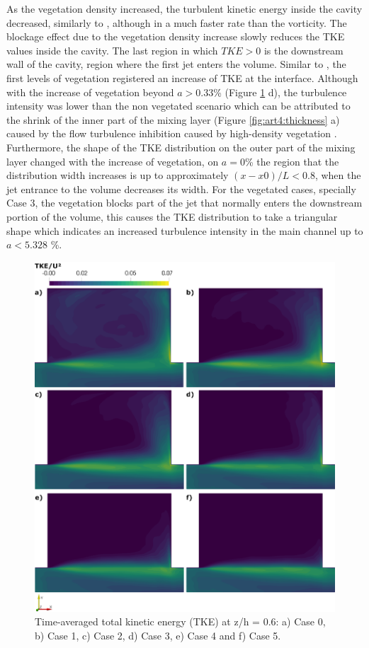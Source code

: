 As the vegetation density increased, the turbulent kinetic energy inside the cavity decreased, similarly to \textcite{xiang2019}, although in a much faster rate than the vorticity. The blockage effect due to the vegetation density increase slowly reduces the TKE values inside the cavity. The last region in which $TKE > 0$ is the downstream wall of the cavity, region where the first jet enters the volume. Similar to \textcite{xiang2019}, the first levels of vegetation registered an increase of TKE at the interface. Although with the increase of vegetation beyond $a > 0.33$\% (Figure \ref{fig:art4:totalTKEMean1} d), the turbulence intensity was lower than the non vegetated scenario which can be attributed to the shrink of the inner part of the mixing layer (Figure \ref{fig:art4:thickness} a) caused by the flow turbulence inhibition caused by high-density vegetation \cite{Nepf2012}. Furthermore, the shape of the TKE distribution on the outer part of the mixing layer changed with the increase of vegetation, on $a = 0$\% the region that the distribution width increases is up to approximately $(x-x0)/L < 0.8$, when the jet entrance to the volume decreases its width. For the vegetated cases, specially Case 3, the vegetation blocks part of the jet that normally enters the downstream portion of the volume, this causes the TKE distribution to take a triangular shape which indicates an increased turbulence intensity in the main channel up to $a < 5.328$ \%.

\begin{figure}[!htb]
\centering
\includegraphics[width=\linewidth]{../images/art4/totalTKEMean1.jpeg}
\caption{Time-averaged total kinetic energy (TKE) at z/h = 0.6: a) Case 0, b) Case 1, c) Case 2, d) Case 3, e) Case 4 and f) Case 5.}
\label{fig:art4:totalTKEMean1}
\end{figure}

